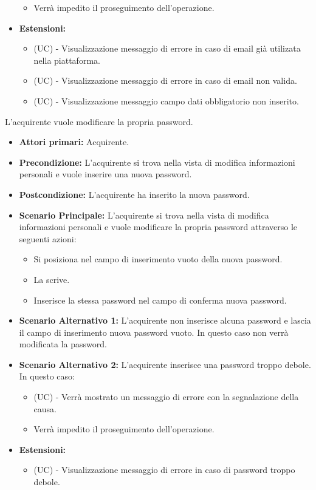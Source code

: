 \begin{itemize}
\begin{itemize}
        \item Verrà impedito il proseguimento dell'operazione.
    \end{itemize}
    \item \textbf{Estensioni:}
    \begin{itemize}
        \item (UC) - Visualizzazione messaggio di errore in caso di email già utilizata nella piattaforma.
        \item (UC) - Visualizzazione messaggio di errore in caso di email non valida.
        \item (UC) - Visualizzazione messaggio campo dati obbligatorio non inserito.
    \end{itemize}
\end{itemize}

L'acquirente vuole modificare la propria password.
\begin{itemize}
    \item \textbf{Attori primari:} Acquirente.
    \item \textbf{Precondizione:} L'acquirente si trova nella vista di modifica informazioni personali e vuole inserire una nuova password.
    \item \textbf{Postcondizione:} L'acquirente ha inserito la nuova password.
    \item \textbf{Scenario Principale:} L'acquirente si trova nella vista di modifica informazioni personali e vuole modificare la propria password attraverso le seguenti azioni:
        \begin{itemize}
            \item Si posiziona nel campo di inserimento vuoto della nuova password.
            \item La scrive.
            \item Inserisce la stessa password nel campo di conferma nuova password.
        \end{itemize}
    \item \textbf{Scenario Alternativo 1:} L'acquirente non inserisce alcuna password e lascia il campo di inserimento nuova password vuoto. In questo caso non verrà modificata la password.
    \item \textbf{Scenario Alternativo 2:} L'acquirente inserisce una password troppo debole. In questo caso:
    \begin{itemize}
        \item (UC) - Verrà mostrato un messaggio di errore con la segnalazione della causa.
        \item Verrà impedito il proseguimento dell'operazione.
    \end{itemize}
    \item \textbf{Estensioni:}
    \begin{itemize}
        \item (UC) - Visualizzazione messaggio di errore in caso di password troppo debole.
    \end{itemize}
\end{itemize}

